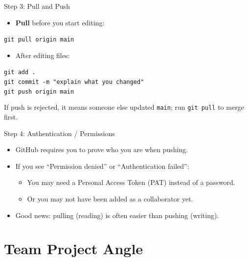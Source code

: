\documentclass{beamer}
\begin{document}
\begin{frame}{Step 3: Pull and Push}
  \begin{itemize}
    \item \textbf{Pull} before you start editing:
  \end{itemize}

  \vspace{1mm}
  \texttt{git pull origin main}

  \vspace{3mm}
  \begin{itemize}
    \item After editing files:
  \end{itemize}

  \vspace{1mm}
  \texttt{git add .}\\
  \texttt{git commit -m "explain what you changed"}\\
  \texttt{git push origin main}

  \vspace{2mm}
  If push is rejected, it means someone else updated \texttt{main}; run \texttt{git pull} to merge first.
\end{frame}

\begin{frame}{Step 4: Authentication / Permissions}
  \begin{itemize}
    \item GitHub requires you to prove who you are when pushing.
    \item If you see ``Permission denied'' or ``Authentication failed'':
      \begin{itemize}
        \item You may need a Personal Access Token (PAT) instead of a password.
        \item Or you may not have been added as a collaborator yet.
      \end{itemize}
    \item Good news: pulling (reading) is often easier than pushing (writing).
  \end{itemize}
\end{frame}

\section{Team Project Angle}
\end{document}
